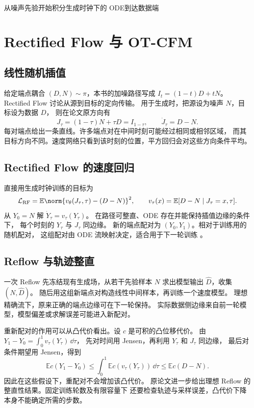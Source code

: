   {从噪声先验开始}{积分生成时钟下的 ODE}{到达数据端}

\section{Rectified Flow 与 OT-CFM}
\label{sec:overview-rectified}

\subsection{线性随机插值}

给定端点耦合 \((D,N)\sim\pi\)，本书的加噪路径写成
\(I_t=(1-t)D+tN\)。Rectified Flow 讨论从源到目标的定向传输。
用于生成时，把源设为噪声 \(N\)，目标设为数据 \(D\)，
则在论文原方向有
\[
  J_\tau=(1-\tau)N+\tau D=I_{1-\tau},\qquad
  \dot J_\tau=D-N .
\]
每对端点给出一条直线。许多端点对在中间时刻可能经过相同或相邻区域，
而其目标方向不同。速度网络只看到该时刻的位置，平方回归会对这些方向条件平均。

\subsection{Rectified Flow 的速度回归}

直接用生成时钟训练的目标为
\begin{equation}
  \mathcal L_{\mathrm{RF}}
       =\mathbb E\norm{v_\theta(J_\tau,\tau)-(D-N)}^2 ,
  \qquad v_\tau(x)=\mathbb E[D-N\mid J_\tau=x,\tau] .
  \label{eq:overview-rectified-loss}
\end{equation}
从 \(Y_0=N\) 解 \(\dot Y_\tau=v_\tau(Y_\tau)\)。
在路径可整直、ODE 存在并能保持插值边缘的条件下，
每个时刻的 \(Y_\tau\) 与 \(J_\tau\) 同边缘。
新的端点配对为 \((Y_0,Y_1)\)。相对于训练用的随机配对，
这组配对由 ODE 流映射决定，适合用于下一轮训练
\cite{liu2023rectified}。

\subsection{Reflow 与轨迹整直}

一次 Reflow 先冻结现有生成场，从若干先验样本 \(N\) 求出模型输出
\(\widehat D\)，收集 \((N,\widehat D)\)。
随后用这组新端点对构造线性中间样本，再训练一个速度模型。
理想精确流下，原来正确的端点边缘可在下一轮保持。
实际数据侧边缘来自前一轮模型，模型偏差或求解误差可能进入新配对。

重新配对的作用可以从凸代价看出。设 \(c\) 是可积的凸位移代价。
由 \(Y_1-Y_0=\int_0^1 v_\tau(Y_\tau)\,\dd\tau\)，
先对时间用 Jensen，再利用 \(Y_\tau\) 和 \(J_\tau\) 同边缘，
最后对条件期望用 Jensen，得到
\[
  \mathbb E c(Y_1-Y_0)
    \le\int_0^1\mathbb E c(v_\tau(Y_\tau))\,\dd\tau
    \le \mathbb E c(D-N) .
\]
因此在这些假设下，重配对不会增加该凸代价。
原论文进一步给出理想 Reflow 的整直性结果。固定训练轮数及有限容量下
还要检查轨迹与采样误差，凸代价下降本身不能确定所需的步数。

